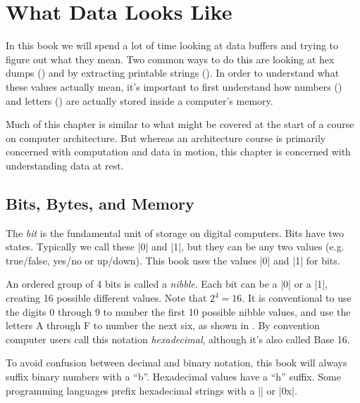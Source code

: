\chapter{What Data Looks Like}

In this book we will spend a lot of time looking at data buffers and
trying to figure out what they mean. Two common ways to do this are
looking at hex dumps () and by extracting
printable strings (). In order to understand
what these values actually mean, it's important
to first understand how numbers () and letters
() are actually stored inside a computer's memory.

Much of this chapter is similar to what might be covered at the start
of a course on computer architecture. But whereas an architecture
course is primarily concerned with computation and data in motion,
this chapter is concerned with understanding data at rest. 

\section{Bits, Bytes, and Memory}\label{sec:numbers}
The \emph{bit} is the fundamental unit of storage on digital computers. Bits
have two states. Typically we call these |0| and |1|, but they can be any
two values (e.g. true/false, yes/no or up/down). This book 
uses the values |0| and |1| for bits.

An ordered group of 4 bits is called a \emph{nibble}. Each bit can be
a |0| or a |1|, creating 16 possible different values. Note
that $2^4=16$. It is conventional to use the digits 0 through 9 to
number the first 10 possible nibble values, and use the letters A
through F to number the next six, as shown in . By
convention computer users call this notation \emph{hexadecimal},
although it's also called Base 16.

To avoid confusion between decimal and binary notation, this book will
always suffix binary numbers with a ``b''. Hexadecimal values have a
``h'' suffix. Some programming languages prefix hexadecimal strings
with a |\x| or |0x|. 



